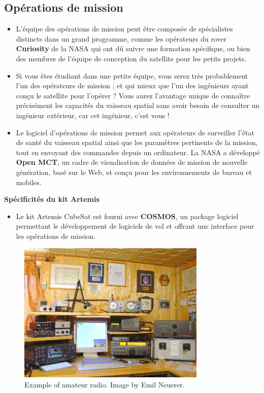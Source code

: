 \subsection{Op\'erations de mission}
\begin{itemize}
    \item L'\'equipe des op\'erations de mission peut \^etre compos\'ee de sp\'ecialistes distincts dans un grand programme, comme les op\'erateurs du rover \textbf{Curiosity} de la NASA qui ont d\^u suivre une formation sp\'ecifique, ou bien des membres de l'\'equipe de conception du satellite pour les petits projets. 

    \item Si vous \^etes \'etudiant dans une petite \'equipe, vous serez tr\`es probablement l'un des op\'erateurs de mission ; et qui mieux que l'un des ing\'enieurs ayant con\c{c}u le satellite pour l'op\'erer ? Vous aurez l'avantage unique de conna\^itre pr\'ecis\'ement les capacit\'es du vaisseau spatial sans avoir besoin de consulter un ing\'enieur ext\'erieur, car cet ing\'enieur, c'est vous !  

    \item Le logiciel d'op\'erations de mission permet aux op\'erateurs de surveiller l'\'etat de sant\'e du vaisseau spatial ainsi que les param\`etres pertinents de la mission, tout en envoyant des commandes depuis un ordinateur. La NASA a d\'evelopp\'e \textbf{Open MCT}, un cadre de visualisation de donn\'ees de mission de nouvelle g\'en\'eration, bas\'e sur le Web, et con\c{c}u pour les environnements de bureau et mobiles.
\end{itemize}
\textbf{Sp\'ecificit\'es du kit Artemis}
\begin{itemize}
    \item Le kit Artemis CubeSat est fourni avec \textbf{COSMOS}, un package logiciel permettant le d\'eveloppement de logiciels de vol et offrant une interface pour les op\'erations de mission.
\end{itemize}
\begin{figure}[H] %
    \centering
    \includegraphics[width=0.8\textwidth]{figures/3.11.jpg}
    \caption{Example of amateur radio. Image by Emil Neuerer.}
    \label{fig:communication2}
\end{figure}
